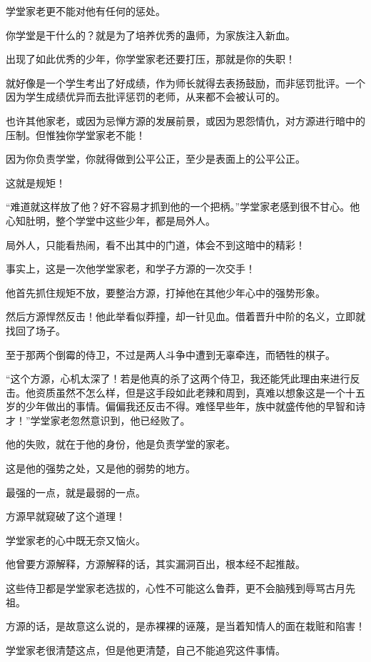 \begin{this_body}
学堂家老更不能对他有任何的惩处。

你学堂是干什么的？就是为了培养优秀的蛊师，为家族注入新血。

出现了如此优秀的少年，你学堂家老还要打压，那就是你的失职！

就好像是一个学生考出了好成绩，作为师长就得去表扬鼓励，而非惩罚批评。一个因为学生成绩优异而去批评惩罚的老师，从来都不会被认可的。

也许其他家老，或因为忌惮方源的发展前景，或因为恩怨情仇，对方源进行暗中的压制。但惟独你学堂家老不能！

因为你负责学堂，你就得做到公平公正，至少是表面上的公平公正。

这就是规矩！

“难道就这样放了他？好不容易才抓到他的一个把柄。”学堂家老感到很不甘心。他心知肚明，整个学堂中这些少年，都是局外人。

局外人，只能看热闹，看不出其中的门道，体会不到这暗中的精彩！

事实上，这是一次他学堂家老，和学子方源的一次交手！

他首先抓住规矩不放，要整治方源，打掉他在其他少年心中的强势形象。

然后方源悍然反击！他此举看似莽撞，却一针见血。借着晋升中阶的名义，立即就找回了场子。

至于那两个倒霉的侍卫，不过是两人斗争中遭到无辜牵连，而牺牲的棋子。

“这个方源，心机太深了！若是他真的杀了这两个侍卫，我还能凭此理由来进行反击。他资质虽然不怎么样，但是这手段如此老辣和周到，真难以想象这是一个十五岁的少年做出的事情。偏偏我还反击不得。难怪早些年，族中就盛传他的早智和诗才！”学堂家老忽然意识到，他已经败了。

他的失败，就在于他的身份，他是负责学堂的家老。

这是他的强势之处，又是他的弱势的地方。

最强的一点，就是最弱的一点。

方源早就窥破了这个道理！

学堂家老的心中既无奈又恼火。

他曾要方源解释，方源解释的话，其实漏洞百出，根本经不起推敲。

这些侍卫都是学堂家老选拔的，心性不可能这么鲁莽，更不会脑残到辱骂古月先祖。

方源的话，是故意这么说的，是赤裸裸的诬蔑，是当着知情人的面在栽赃和陷害！

学堂家老很清楚这点，但是他更清楚，自己不能追究这件事情。


\end{this_body}
